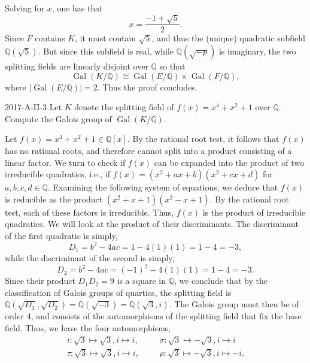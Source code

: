 \documentclass{article}
\begin{document}
	Solving for $x$, one has that 
	\begin{equation*}
		x = \frac{-1 +\sqrt{5}}{2}. 
	\end{equation*}
	Since $F$ contains $K$, it must contain $\sqrt{5}$, and thus the (unique) quadratic subfield $\mathbb{Q}(\sqrt{5})$. But since this subfield is real, while $\mathbb{Q}(\sqrt{-p})$ is imaginary, the two splitting fields are linearly disjoint over $\mathbb{Q}$ so that
	\begin{equation*}
		\operatorname{Gal}(K/\mathbb{Q}) \cong \operatorname{Gal}(E/\mathbb{Q})\times \operatorname{Gal}(F/\mathbb{Q}), 
	\end{equation*}	
	where $|\operatorname{Gal}(E/\mathbb{Q})| = 2$. Thus the proof concludes. 
	\begin{prb}{2017-A-II-3}
		Let $K$ denote the splitting field of $f(x) = x^{4} + x^{2} + 1$ over $\mathbb{Q}$. Compute the Galois group of $\operatorname{Gal}(K/\mathbb{Q})$. 
	\end{prb}
	Let $f(x) = x^{4} + x^{2} + 1 \in \mathbb{Q}[x]$. By the rational root test, it follows that $f(x)$ has no rational roots, and therefore cannot split into a product consisting of a linear factor. We turn to check if $f(x)$ can be expanded into the product of two irreducible quadratics, i.e., if $f(x) = (x^{2} + ax + b)(x^{2} + cx + d)$ for $a, b, c, d \in \mathbb{Q}$. Examining the following system of equations, we deduce that $f(x)$ is reducible as the product $(x^{2} + x + 1)(x^{2} -x + 1)$. By the rational root test, each of these factors is irreducible. Thus, $f(x)$ is the product of irreducible quadratics. We will look at the product of their discriminants. The discriminant of the first quadratic is simply, 
	\begin{equation*}
		D_{1} = b^{2} - 4ac = 1 - 4(1)(1) = 1 -4 = -3, 
	\end{equation*}
	while the discriminant of the second is simply, 
	\begin{equation*}
		D_{2} = b^{2} - 4ac = (-1)^{2} - 4(1)(1) = 1 - 4 = -3. 
	\end{equation*}
	Since their product $D_{1}D_{2} = 9$ is a square in $\mathbb{Q}$, we conclude that by the classification of Galois groups of quartics, the splitting field is $\mathbb{Q}(\sqrt{D_{1}}, \sqrt{D_{2}}) = \mathbb{Q}(\sqrt{-3}) = \mathbb{Q}(\sqrt{3}, i)$. The Galois group must then be of order 4, and consists of the automorphisms of the splitting field that fix the base field. Thus, we have the four automorphisms, 
	\begin{equation*}
		\begin{matrix}
			i: \sqrt{3} \mapsto \sqrt{3}, i \mapsto i, & & & \sigma: \sqrt{3} \mapsto -\sqrt{3}, i \mapsto i \\
			\tau: \sqrt{3} \mapsto \sqrt{3}, i \mapsto i, & & & \rho: \sqrt{3} \mapsto -\sqrt{3}, i \mapsto -i. 
		\end{matrix}
	\end{equation*}
\end{document}
